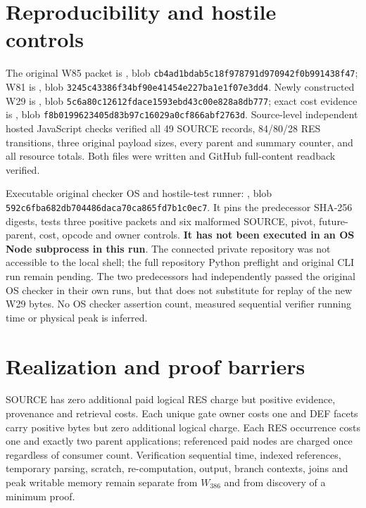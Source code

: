 \documentclass[11pt]{article}
\begin{document}
\section*{Reproducibility and hostile controls}
The original W85 packet is , blob \texttt{cb4ad1bdab5c18f978791d970942f0b991438f47}; W81 is , blob \texttt{3245c43386f34bf90e41454e227ba1e1f07e3dd4}. Newly constructed W29 is , blob \texttt{5c6a80c12612fdace1593ebd43c00e828a8db777}; exact cost evidence is , blob \texttt{f8b0199623405d83b97c16029a0cf866abf2763d}. Source-level independent hosted JavaScript checks verified all 49 SOURCE records, 84/80/28 RES transitions, three original payload sizes, every parent and summary counter, and all resource totals. Both files were written and GitHub full-content readback verified.

Executable original checker OS and hostile-test runner: , blob \texttt{592c6fba682db704486daca70ca865fd7b1c0ec7}. It pins the predecessor SHA-256 digests, tests three positive packets and six malformed SOURCE, pivot, future-parent, cost, opcode and owner controls. \textbf{It has not been executed in an OS Node subprocess in this run}. The connected private repository was not accessible to the local shell; the full repository Python preflight and original CLI run remain pending. The two predecessors had independently passed the original OS checker in their own runs, but that does not substitute for replay of the new W29 bytes. No OS checker assertion count, measured sequential verifier running time or physical peak is inferred.

\section*{Realization and proof barriers}
SOURCE has zero additional paid logical RES charge but positive evidence, provenance and retrieval costs. Each unique gate owner costs one and DEF facets carry positive bytes but zero additional logical charge. Each RES occurrence costs one and exactly two parent applications; referenced paid nodes are charged once regardless of consumer count. Verification sequential time, indexed references, temporary parsing, scratch, re-computation, output, branch contexts, joins and peak writable memory remain separate from $W_{386}$ and from discovery of a minimum proof.
\end{document}
